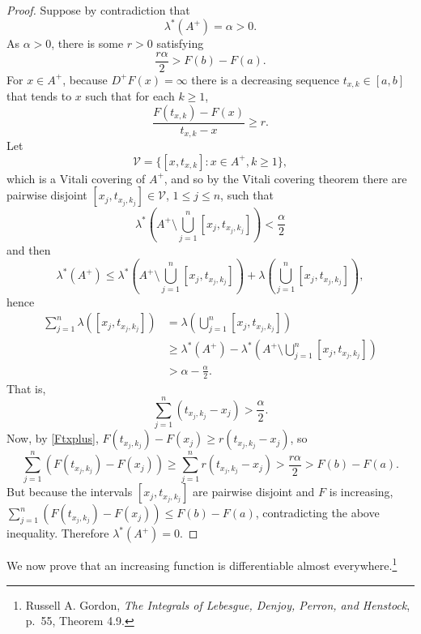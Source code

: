 \documentclass{article}
\theoremstyle{definition}
\begin{document}
\begin{proof}
Suppose by contradiction that
\[
\lambda^*(A^+)=\alpha>0.
\]
As $\alpha>0$, there is some
$r>0$ satisfying
\[
\frac{r\alpha}{2}>F(b)-F(a).
\]
For $x \in A^+$, because $D^+F(x)=\infty$ there is a decreasing sequence
$t_{x,k} \in [a,b]$ that tends to $x$ such that for each $k \geq 1$,
\begin{equation}
\frac{F(t_{x,k})-F(x)}{t_{x,k}-x} \geq r.
\label{Ftxplus}
\end{equation}
Let
\[
\mathcal{V} = \{[x,t_{x,k}]: x \in A^+, k \geq 1\},
\]
which is a Vitali covering of $A^+$, and so by the Vitali covering theorem there are
pairwise disjoint $[x_j,t_{x_j,k_j}] \in  \mathcal{V}$, $1 \leq j \leq n$, such that 
\[
\lambda^*\left(A^+ \setminus \bigcup_{j=1}^n [x_j,t_{x_j,k_j}]\right) < \frac{\alpha}{2}
\]
and then
\[
\lambda^*(A^+) \leq \lambda^*\left(A^+ \setminus \bigcup_{j=1}^n [x_j,t_{x_j,k_j}]\right)
+\lambda\left( \bigcup_{j=1}^n [x_j,t_{x_j,k_j}]\right),
\]
hence
\begin{align*}
\sum_{j=1}^n \lambda( [x_j,t_{x_j,k_j}])&=\lambda\left( \bigcup_{j=1}^n [x_j,t_{x_j,k_j}]\right)\\
&\geq  \lambda^*(A^+)  -  \lambda^*\left(A^+ \setminus \bigcup_{j=1}^n [x_j,t_{x_j,k_j}]\right)\\
&>\alpha - \frac{\alpha}{2}.
\end{align*}
That is,
\[
\sum_{j=1}^n (t_{x_j,k_j} - x_j) > \frac{\alpha}{2}.
\]
Now, by \eqref{Ftxplus}, $F(t_{x_j,k_j})-F(x_j) \geq r(t_{x_j,k_j}-x_j)$, so
\[
\sum_{j=1}^n (F(t_{x_j,k_j})-F(x_j)) \geq
\sum_{j=1}^n r(t_{x_j,k_j} - x_j) > \frac{r\alpha}{2}>F(b)-F(a).
\]
But because the intervals $[x_j,t_{x_j,k_j}]$ are pairwise disjoint and $F$ is increasing,
$\sum_{j=1}^n (F(t_{x_j,k_j})-F(x_j)) \leq F(b)-F(a)$, contradicting the above inequality.
Therefore $\lambda^*(A^+)=0$. 
\end{proof}




We now prove that an increasing function is differentiable almost everywhere.\footnote{Russell A. Gordon, {\em The Integrals of Lebesgue, Denjoy, Perron, and Henstock}, p.~55, Theorem 4.9.}
\end{document}
